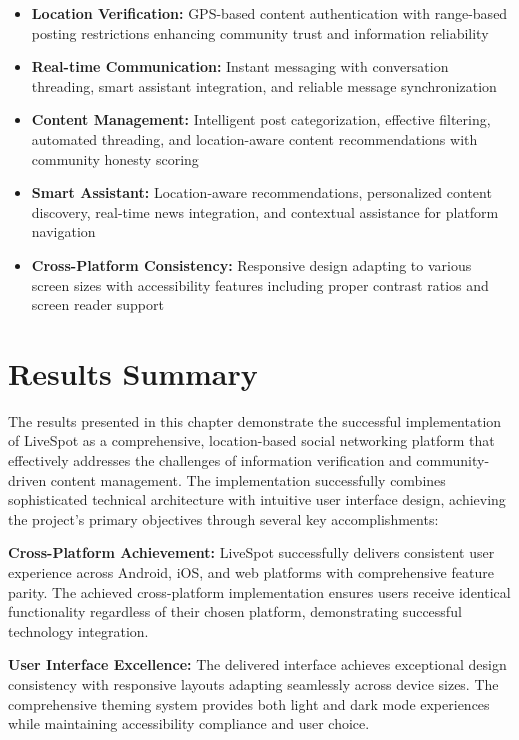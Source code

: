 \begin{itemize}
    \item \textbf{Location Verification:} GPS-based content authentication with range-based posting restrictions enhancing community trust and information reliability
    \item \textbf{Real-time Communication:} Instant messaging with conversation threading, smart assistant integration, and reliable message synchronization
    \item \textbf{Content Management:} Intelligent post categorization, effective filtering, automated threading, and location-aware content recommendations with community honesty scoring
    \item \textbf{Smart Assistant:} Location-aware recommendations, personalized content discovery, real-time news integration, and contextual assistance for platform navigation
    \item \textbf{Cross-Platform Consistency:} Responsive design adapting to various screen sizes with accessibility features including proper contrast ratios and screen reader support
\end{itemize}
\clearpage
\section{Results Summary}\label{sec:results_summary}

The results presented in this chapter demonstrate the successful implementation of LiveSpot as a comprehensive, location-based social networking platform that effectively addresses the challenges of information verification and community-driven content management. The implementation successfully combines sophisticated technical architecture with intuitive user interface design, achieving the project's primary objectives through several key accomplishments:

\textbf{Cross-Platform Achievement:}
LiveSpot successfully delivers consistent user experience across Android, iOS, and web platforms with comprehensive feature parity. The achieved cross-platform implementation ensures users receive identical functionality regardless of their chosen platform, demonstrating successful technology integration.

\textbf{User Interface Excellence:}
The delivered interface achieves exceptional design consistency with responsive layouts adapting seamlessly across device sizes. The comprehensive theming system provides both light and dark mode experiences while maintaining accessibility compliance and user choice.

